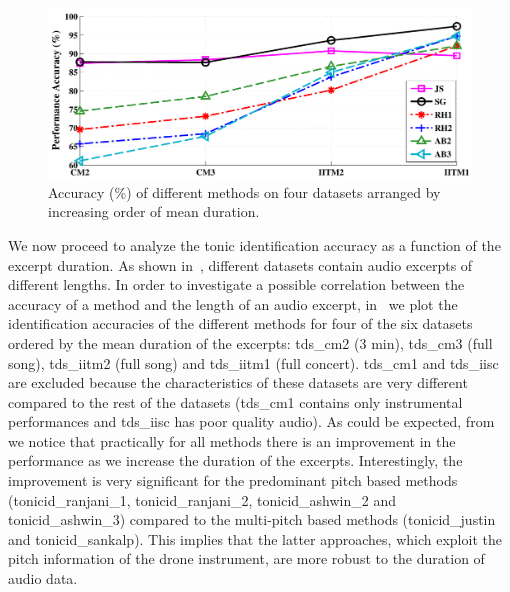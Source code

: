 {\begin{figure}
	\begin{center}
		\includegraphics[width=\figSizeNinety]{ch05_preprocessing/figures/Accuracy_Length.pdf}
	\end{center}
	\caption{Accuracy (\%) of different methods on four datasets arranged
		by increasing order of mean duration.}
	\label{fig:tonic_id_accuracy_vs_length}
\end{figure}


We now proceed to analyze the tonic identification accuracy as a function of the excerpt duration. As shown in~, different datasets contain audio excerpts of different lengths. In order to investigate a possible correlation between the accuracy of a method and the length of an audio
excerpt, in~ we plot the identification accuracies of the different methods for four of the six datasets ordered
by the mean duration of the excerpts: \acrshort{tds_cm2} (3 min), \acrshort{tds_cm3} (full song), \acrshort{tds_iitm2} (full song) and \acrshort{tds_iitm1} (full concert). \acrshort{tds_cm1} and \acrshort{tds_iisc} are excluded because the characteristics of these datasets are very different compared to the rest of the datasets (\acrshort{tds_cm1} contains only instrumental performances and \acrshort{tds_iisc} has poor quality audio). As could be expected, from~ we notice that practically for all methods there is an improvement in the performance as we increase the duration
of the excerpts. Interestingly, the improvement is very significant for the predominant pitch based methods (\acrshort{tonicid_ranjani_1}, \acrshort{tonicid_ranjani_2}, \acrshort{tonicid_ashwin_2} and \acrshort{tonicid_ashwin_3}) compared to the multi-pitch based methods (\acrshort{tonicid_justin} and \acrshort{tonicid_sankalp}). This implies that the latter approaches, which exploit the pitch information of the drone instrument, are more robust to the duration of audio data.

}
